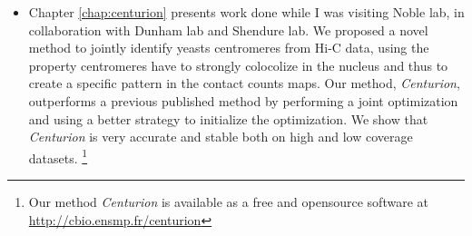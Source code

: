 \begin{itemize}
\item Chapter \ref{chap:centurion} presents work done while I was visiting
Noble lab, in collaboration with Dunham lab and Shendure lab. We proposed a
novel method to jointly identify yeasts centromeres from Hi-C data, using the
property centromeres have to strongly colocolize in the nucleus and thus to
create a specific pattern in the contact counts maps. Our method,
\textit{Centurion}, outperforms a previous published method by performing a
joint optimization and using a better strategy to initialize the optimization.
We show that \textit{Centurion} is very accurate and stable both on high and
low coverage datasets. \footnote{Our method \textit{Centurion} is available as
a free and opensource software at \url{http://cbio.ensmp.fr/centurion}}


\end{itemize}
